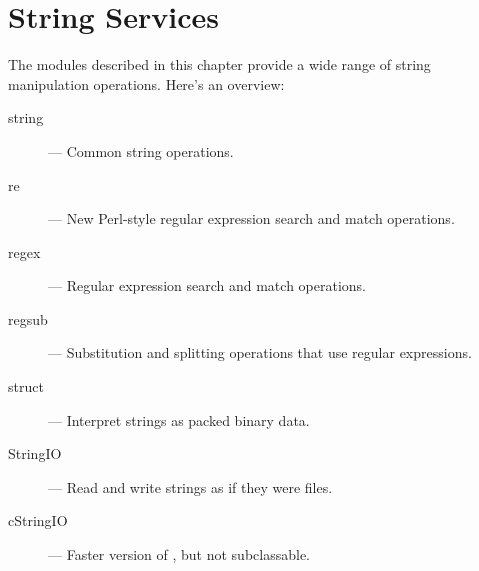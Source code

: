 \chapter{String Services}
\label{strings}

The modules described in this chapter provide a wide range of string
manipulation operations.  Here's an overview:

\begin{description}

\item[string]
--- Common string operations.

\item[re]
--- New Perl-style regular expression search and match operations.

\item[regex]
--- Regular expression search and match operations.

\item[regsub]
--- Substitution and splitting operations that use regular expressions.

\item[struct]
--- Interpret strings as packed binary data.

\item[StringIO]
--- Read and write strings as if they were files.

\item[cStringIO]
--- Faster version of , but not subclassable.

\end{description}
